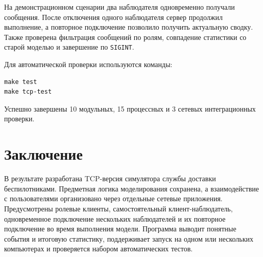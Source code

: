 \documentclass[12pt,a4paper]{article}
\begin{document}
На демонстрационном сценарии два наблюдателя одновременно получали сообщения. После отключения одного наблюдателя сервер продолжил выполнение, а повторное подключение позволило получить актуальную сводку. Также проверена фильтрация сообщений по ролям, совпадение статистики со старой моделью и завершение по \texttt{SIGINT}.

Для автоматической проверки используются команды:
\begin{lstlisting}
make test
make tcp-test
\end{lstlisting}

Успешно завершены 10 модульных, 15 процессных и 3 сетевых интеграционных проверки.

\section{Заключение}

В результате разработана TCP-версия симулятора службы доставки беспилотниками. Предметная логика моделирования сохранена, а взаимодействие с пользователями организовано через отдельные сетевые приложения. Предусмотрены ролевые клиенты, самостоятельный клиент-наблюдатель, одновременное подключение нескольких наблюдателей и их повторное подключение во время выполнения модели. Программа выводит понятные события и итоговую статистику, поддерживает запуск на одном или нескольких компьютерах и проверяется набором автоматических тестов.
\end{document}
